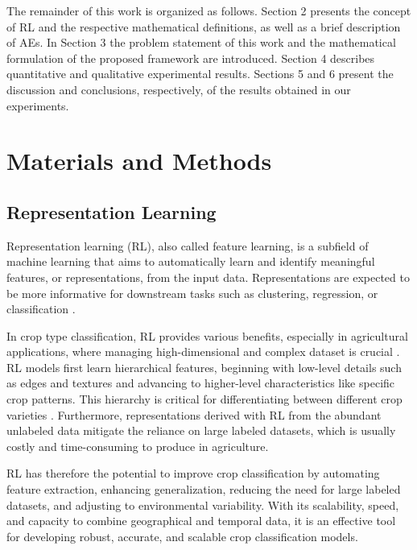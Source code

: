 \documentclass[journal,article,submit,pdftex,moreauthors]{Definitions/mdpi}
\begin{document}
The remainder of this work is organized as follows. Section 2 presents the concept of RL and the respective mathematical definitions, as well as a brief description of AEs. 
In Section 3 the problem statement of this work and the mathematical formulation of the proposed framework are introduced. 
Section 4 describes quantitative and qualitative experimental results. 
Sections 5 and 6 present the discussion and conclusions, respectively, of the results obtained in our experiments.

\section{Materials and Methods}
\subsection{Representation Learning}
Representation learning (RL), also called feature learning, is a subfield of machine learning
that aims to automatically learn and identify meaningful features, or representations, from the input data. Representations are expected to be more informative for downstream tasks such as clustering, regression, or classification \cite{Tzelepi2022}.

In crop type classification, \ac{RL} provides various benefits, especially in agricultural applications, where managing high-dimensional and complex dataset is crucial \cite{Reichstein2019}. \ac{RL} models first learn hierarchical features, beginning with low-level details such as edges and textures and advancing to higher-level characteristics like specific crop patterns. This hierarchy is critical for differentiating between different crop varieties \cite{Kussul2017}. Furthermore, representations derived with \ac{RL} from the abundant unlabeled data mitigate the reliance on large labeled datasets, which is usually costly and time-consuming to produce in agriculture.

\ac{RL} has therefore the potential to improve crop classification by automating feature extraction, enhancing generalization, reducing the need for large labeled datasets, and adjusting to environmental variability. With its scalability, speed, and capacity to combine geographical and temporal data, it is an effective tool for developing robust, accurate, and scalable crop classification models.
\end{document}
